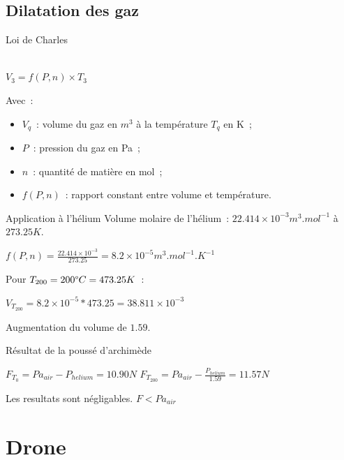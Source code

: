 \documentclass{beamer}
\begin{document}
\subsection{Dilatation des gaz}

\begin{frame}{Loi de Charles}
  \begin{center}
     \\
    $\displaystyle{V_3 = f(P, n) \times T_3}$
  \end{center}
  Avec~:
  \begin{itemize}
    \item $V_q$~: volume du gaz en $m^3$ à la température $T_q$ en K~;
    \item $P$~: pression du gaz en Pa~;
    \item $n$~: quantité de matière en mol~;
    \item $f(P, n)$~: rapport constant entre volume et température.
  \end{itemize}
\end{frame}

\begin{frame}{Application à l'hélium}
  Volume molaire de l'hélium~: $22.414\times 10^{-3} m^3.mol^{-1}$ à $273.25K$.
  \begin{center}
    $\displaystyle{f(P, n) = \frac{22.414\times 10^{-3}}{273.25} = 8.2\times 10^{-5} m^3.mol^{-1}.K^{-1}}$
  \end{center}
  Pour $T_{200} = 200 \degree C = 473.25 K$~:
  \begin{center}
    $\displaystyle{V_{T_{200}} = 8.2\times 10^{-5} * 473.25 = 38.811 \times 10^{-3}}$
  \end{center}
  Augmentation du volume de $1.59$.
\end{frame}

\begin{frame}{Résultat de la poussé d'archimède}
  \begin{center}
    $\displaystyle{F_{T_0} = Pa_{air} - P_{helium} = 10.90 N}$
    \bigbreak
    $\displaystyle{F_{T_{200}} = Pa_{air} - \frac{P_{helium}}{1.59} = 11.57 N}$ \\
  \end{center}
  Les resultats sont négligables. $F < Pa_{air}$
\end{frame}

\section{Drone}
\end{document}
